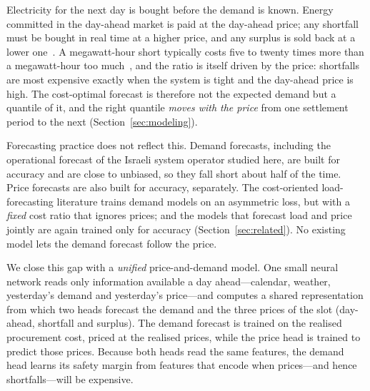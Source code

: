 Electricity for the next day is bought before the demand is known.  Energy
committed in the day-ahead market is paid at the day-ahead price; any
shortfall must be bought in real time at a higher price, and any surplus is
sold back at a lower one~\parencite{stoft2002power, kirschen2018fundamentals}.
A megawatt-hour short typically costs five to twenty times more than a
megawatt-hour too much~\parencite{zhang2022costoriented}, and the ratio is
itself driven by the price: shortfalls are most expensive exactly when the
system is tight and the day-ahead price is high.  The cost-optimal forecast is
therefore not the expected demand but a quantile of it, and the right quantile
\emph{moves with the price} from one settlement period to the next
(Section~\ref{sec:modeling}).

Forecasting practice does not reflect this.  Demand forecasts, including the
operational forecast of the Israeli system operator studied here, are built
for accuracy and are close to unbiased, so they fall short about half of the
time.  Price forecasts are also built for accuracy, separately.  The
cost-oriented load-forecasting literature trains demand models on an
asymmetric loss, but with a \emph{fixed} cost ratio that ignores prices; and
the models that forecast load and price jointly are again trained only for
accuracy (Section~\ref{sec:related}).  No existing model lets the demand
forecast follow the price.

We close this gap with a \emph{unified} price-and-demand model.  One small
neural network reads only information available a day ahead---calendar,
weather, yesterday's demand and yesterday's price---and computes a shared
representation from which two heads forecast the demand and the three prices
of the slot (day-ahead, shortfall and surplus).  The demand forecast is trained
on the realised procurement cost, priced at the realised prices, while the
price head is trained to predict those prices.  Because both heads read the
same features, the demand head learns its safety margin from features that
encode when prices---and hence shortfalls---will be expensive.

